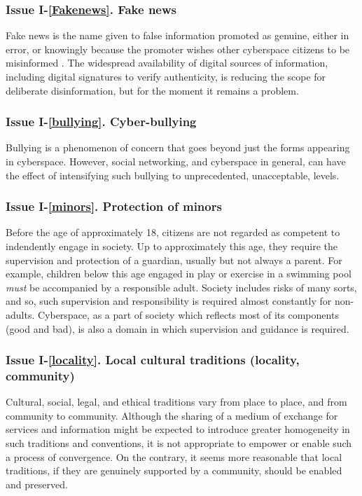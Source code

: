 \subsubsection*{Issue I-\ref{Fakenews}. {Fake news}}\label{disinfsol}
%
Fake news is the name given to false information promoted as
genuine, either in error, or knowingly because the promoter wishes
other cyberspace citizens to be misinformed  \cite{carson2021fighting}.
The widespread availability of digital sources of information, including
digital signatures to verify authenticity, is reducing the scope for
deliberate disinformation, but for the moment it remains a problem.

\subsubsection*{Issue I-\ref{bullying}. {Cyber-bullying}}\label{bullyingsol}
%
Bullying is a phenomenon of concern that goes beyond just the forms
appearing in cyberspace. However, social networking, and cyberspace in general,
can have the effect of intensifying such bullying to unprecedented, unacceptable, levels.


\subsubsection*{Issue I-\ref{minors}. {Protection of minors}}\label{minorssol}
%
Before the age of approximately 18, citizens are not regarded as competent
to indendently engage in society. Up to approximately this age, they
require the supervision and protection of a guardian, usually but not always 
a parent. For example, children below this age engaged in play or exercise in a swimming
pool {\em must} be accompanied by a responsible adult. Society includes 
risks of many sorts, and so, such supervision and responsibility is
required almost constantly for non-adults. Cyberspace, as a part of society which
reflects most of its components (good and bad), is also a domain
in which supervision and guidance is required.


\subsubsection*{Issue I-\ref{locality}. {Local cultural traditions (locality, community)}}\label{localitysol}
%
Cultural, social, legal, and ethical traditions vary from place to place, and from community
to community. Although the sharing of a medium of exchange for services and information might
be expected to introduce greater homogeneity in such traditions and conventions, it is not
appropriate to empower or enable such a process of convergence. On the contrary, it seems
more reasonable that local traditions, if they are genuinely supported by a community, should
be enabled and preserved.

